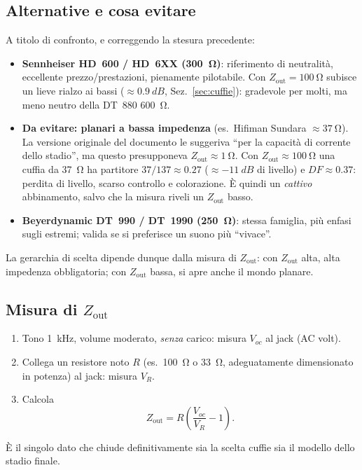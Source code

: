 \subsection{Alternative e cosa evitare}
A titolo di confronto, e correggendo la stesura precedente:
\begin{itemize}
  \item \textbf{Sennheiser HD~600 / HD~6XX (\SI{300}{\ohm})}: riferimento
        di neutralità, eccellente prezzo/prestazioni, pienamente
        pilotabile. Con $Z_{\text{out}}=\SI{100}{\ohm}$ subisce un lieve
        rialzo ai bassi ($\approx\SI{+0.9}{dB}$, Sez.~\ref{sec:cuffie}):
        gradevole per molti, ma meno neutro della DT~880 \SI{600}{\ohm}.
  \item \textbf{Da evitare: planari a bassa impedenza} (es.\ Hifiman
        Sundara $\approx\SI{37}{\ohm}$). La versione originale del
        documento le suggeriva ``per la capacità di corrente dello
        stadio'', ma questo presupponeva $Z_{\text{out}}\approx\SI{1}{\ohm}$.
        Con $Z_{\text{out}}\approx\SI{100}{\ohm}$ una cuffia da
        \SI{37}{\ohm} ha partitore $37/137\approx0.27$ ($\approx\SI{-11}{dB}$
        di livello) e $DF\approx0.37$: perdita di livello, scarso
        controllo e colorazione. \`E quindi un \emph{cattivo}
        abbinamento, salvo che la misura riveli un $Z_{\text{out}}$ basso.
  \item \textbf{Beyerdynamic DT~990 / DT~1990 (\SI{250}{\ohm})}: stessa
        famiglia, più enfasi sugli estremi; valida se si preferisce un
        suono più ``vivace''.
\end{itemize}
La gerarchia di scelta dipende dunque dalla misura di $Z_{\text{out}}$:
con $Z_{\text{out}}$ alta, alta impedenza obbligatoria; con $Z_{\text{out}}$
bassa, si apre anche il mondo planare.

\subsection{Misura di \texorpdfstring{$Z_{\text{out}}$}{Zout}}\label{sec:zout-mis}
\begin{enumerate}
  \item Tono \SI{1}{kHz}, volume moderato, \emph{senza} carico: misura
        $V_{oc}$ al jack (AC volt).
  \item Collega un resistore noto $R$ (es.\ \SI{100}{\ohm} o
        \SI{33}{\ohm}, adeguatamente dimensionato in potenza) al jack:
        misura $V_{R}$.
  \item Calcola
        \begin{equation}
          Z_{\text{out}}=R\left(\frac{V_{oc}}{V_{R}}-1\right).
        \end{equation}
\end{enumerate}
È il singolo dato che chiude definitivamente sia la scelta cuffie sia il
modello dello stadio finale.

